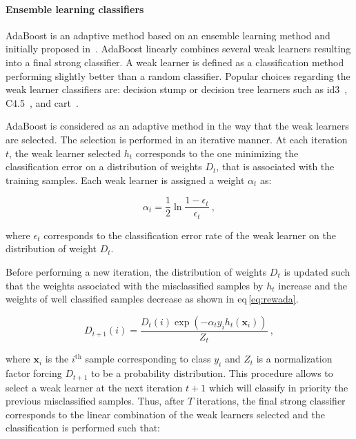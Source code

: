 \paragraph{Ensemble learning classifiers}
AdaBoost is an adaptive method based on an ensemble learning method and initially proposed in~\cite{Freund1997}. 
AdaBoost linearly combines several weak learners resulting into a final strong classifier.
A weak learner is defined as a classification method performing slightly better than a random classifier.
Popular choices regarding the weak learner classifiers are: decision stump or decision tree learners such as \ac{id3}~\cite{Quinlan1986}, C4.5~\cite{Quinlan1993}, and \ac{cart}~\cite{Breiman1984}.

AdaBoost is considered as an adaptive method in the way that the weak learners are selected.
The selection is performed in an iterative manner.
At each iteration $t$, the weak learner selected $h_t$ corresponds to the one minimizing the classification error on a distribution of weights $D_t$, that is associated with the training samples.
Each weak learner is assigned a weight $\alpha_t$ as:

\begin{equation}
	\alpha_t = \frac{1}{2} \ln \frac{1 - \epsilon_t}{\epsilon_t} \ ,
	\label{eq:wclssada}
\end{equation}

\noindent where $\epsilon_t$ corresponds to the classification error rate of the weak learner on the distribution of weight $D_t$.

Before performing a new iteration, the distribution of weights $D_t$ is updated such that the weights associated with the misclassified samples by $h_t$ increase and the weights of well classified samples decrease as shown in \acs{eq}\,\eqref{eq:rewada}.

\begin{equation}
	D_{t+1}(i) = \frac{ D_t(i) \exp \left( -\alpha_t y_i h_{t}(\mathbf{x}_{i} ) \right) }{ Z_t  } \ ,
	\label{eq:rewada} 
\end{equation}

\noindent where $\mathbf{x}_i$ is the $i^{\text{th}}$ sample corresponding to class $y_i$ and $Z_t$ is a normalization factor forcing $D_{t+1}$ to be a probability distribution. 
This procedure allows to select a weak learner at the next iteration $t+1$ which will classify in priority the previous misclassified samples. 
Thus, after $T$ iterations, the final strong classifier corresponds to the linear combination of the weak learners selected and the classification is performed such that:

